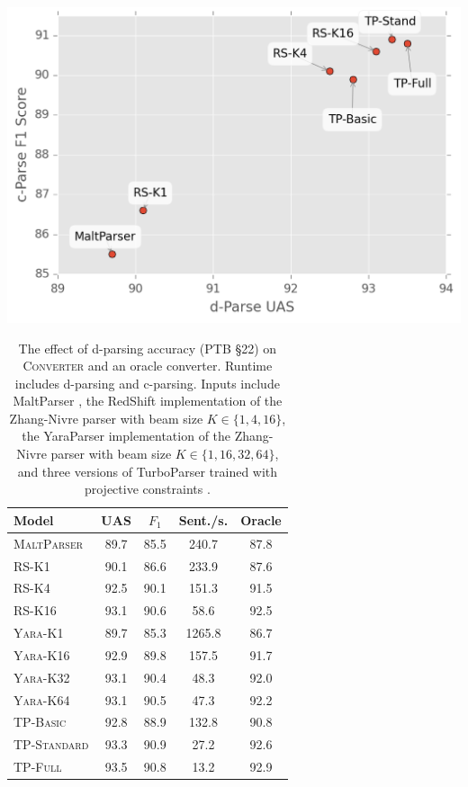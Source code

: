 \documentclass[11pt,letterpaper]{article}
\newcommand{\ParseName}{\textsc{Converter}\xspace}
\begin{document}
\begin{table}
  \centering
  \small
  \includegraphics[scale=0.55]{../notebooks/parsers}
  \begin{tabular}[scale=0.8]{lcccc}
    \toprule
    Model & UAS  & $F_1$ & Sent./s.  & Oracle  \\
    \midrule
    \textsc{MaltParser}  & 89.7 & 85.5 & 240.7& 87.8 \\
    \textsc{RS-K1}       & 90.1 & 86.6 & 233.9& 87.6 \\
    \textsc{RS-K4}       & 92.5 & 90.1 & 151.3& 91.5 \\
    \textsc{RS-K16}      & 93.1 & 90.6 & 58.6 & 92.5 \\
    \textsc{Yara-K1}     & 89.7 & 85.3 & 1265.8 & 86.7 \\
    \textsc{Yara-K16}     & 92.9 & 89.8 & 157.5 & 91.7 \\
    \textsc{Yara-K32}     & 93.1 & 90.4 & 48.3 & 92.0 \\
    \textsc{Yara-K64}     & 93.1 & 90.5 & 47.3 & 92.2 \\
    \textsc{TP-Basic}    & 92.8 & 88.9 & 132.8& 90.8 \\
    \textsc{TP-Standard} & 93.3 & 90.9 & 27.2 & 92.6 \\
    \textsc{TP-Full}     & 93.5 & 90.8 & 13.2 & 92.9 \\
    \bottomrule
  \end{tabular}
  \caption{The effect of d-parsing accuracy (PTB \S 22)
    on \ParseName{} and an oracle converter.  Runtime includes
    d-parsing and c-parsing.  
    Inputs include 
 MaltParser \cite{nivre2006maltparser}, 
    the RedShift implementation of the Zhang-Nivre parser
    \cite{zhang2011transition} with beam size $K \in \{1, 4, 16\}$,
the YaraParser implementation of the Zhang-Nivre parser
    \cite{zhang2011transition} with beam size $K \in \{1, 16, 32, 64\}$, and three versions of TurboParser trained with projective constraints
    \cite{martins2013turning}.
\label{tab:oracle} }

\end{table}
\end{document}
